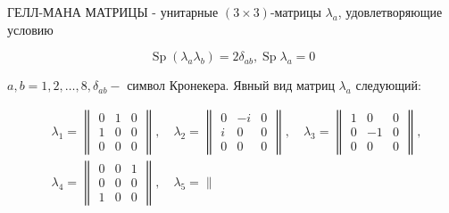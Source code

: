 \documentclass[10pt]{article}
\begin{document}
ГЕЛЛ-МАНА МАТРИЦЫ - унитарные $(3 \times 3)$-матрицы $\lambda_{a}$, удовлетворяющие условию



\[

\operatorname{Sp}\left(\lambda_{a} \lambda_{b}\right)=2 \delta_{a b}, \operatorname{Sp} \lambda_{a}=0

\]



$a, b=1,2, \ldots, 8, \delta_{a b}-$ символ Кронекера. Явный вид матриц $\lambda_{a}$ следующий:



\[

\begin{aligned}

& \lambda_{1}=\left\|\begin{array}{lll}

0 & 1 & 0 \\

1 & 0 & 0 \\

0 & 0 & 0

\end{array}\right\|, \quad \lambda_{2}=\left\|\begin{array}{rrr}

0 & -i & 0 \\

i & 0 & 0 \\

0 & 0 & 0

\end{array}\right\|, \quad \lambda_{3}=\left\|\begin{array}{rrr}

1 & 0 & 0 \\

0 & -1 & 0 \\

0 & 0 & 0

\end{array}\right\|, \\

& \lambda_{4}=\left\|\begin{array}{lll}

0 & 0 & 1 \\

0 & 0 & 0 \\

1 & 0 & 0

\end{array}\right\|, \quad \lambda_{5}=\left\|\begin{array}{ccc}


\end{array}
\end{aligned}\]
\end{document}
